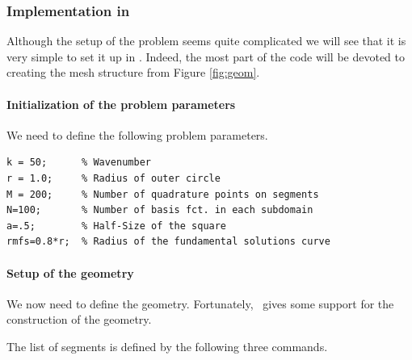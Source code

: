 \subsubsection{Implementation in \mpspack}

Although the setup of the problem seems quite complicated we will see
that it is very simple to set it up in \mpspack. Indeed, the most part
of the code will be devoted to creating the mesh structure from
Figure \ref{fig:geom}.

\paragraph{Initialization of the problem parameters}

We need to define the following problem parameters.
\begin{verbatim}
k = 50;      % Wavenumber
r = 1.0;     % Radius of outer circle    
M = 200;     % Number of quadrature points on segments
N=100;       % Number of basis fct. in each subdomain
a=.5;        % Half-Size of the square
rmfs=0.8*r;  % Radius of the fundamental solutions curve
\end{verbatim}


\paragraph{Setup of the geometry}

We now need to define the geometry. Fortunately,
\mpspack\ gives some support for the construction of the geometry.

The list of segments is defined by the following three commands.

